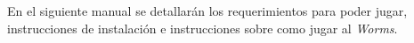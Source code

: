 En el siguiente manual se detallarán los requerimientos para poder jugar, instrucciones de instalación e instrucciones sobre como jugar al \emph{Worms}. 
